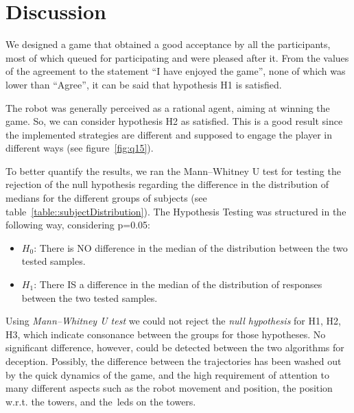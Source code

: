 \section{Discussion}\label{sec:deception_discussion}
We designed a game that obtained a good acceptance by all the participants, most of which queued for participating and were pleased after it. From the values of the agreement to the statement ``I have enjoyed the game'', none of which was lower than ``Agree'', it can be said that hypothesis H1 is satisfied.  

The robot was generally perceived as a rational agent, aiming at winning the game. So, we can consider hypothesis H2 as satisfied. This is a good result since the implemented strategies are different and supposed to engage the player in different ways (see figure~\ref{fig:q15}).

To better quantify the results, we ran the Mann–Whitney U test for testing the rejection of the null hypothesis regarding the difference in the distribution of medians for the different groups of subjects (see table~\ref{table::subjectDistribution}). The Hypothesis Testing was structured in the following way, considering p=0.05:

\begin{itemize}
    \item $H_{0}$: There is NO difference in the median of the distribution between the two tested samples.
    \item $H_{1}$: There IS a difference in the median of the distribution of responses between the two tested samples.
\end{itemize}

Using \textit{Mann–Whitney U test} we could not reject the \textit{null hypothesis} for H1, H2, H3, which indicate consonance between the groups for those hypotheses. No significant difference, however, could be detected between the two algorithms for deception. Possibly, the difference between the trajectories has been washed out by the quick dynamics of the game, and the high requirement of attention to many different aspects such as the robot movement and position, the position w.r.t. the towers, and the~\gls{led}s on the towers. 

